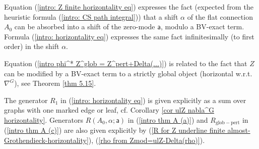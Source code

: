 \documentclass[11pt,a4paper]{amsart}
\theoremstyle{plain} %
\theoremstyle{definition}
\theoremstyle{remark}
\newcommand{\mr}{\mathrm}
\newcommand{\sfa}{\mathsf{a}}
\begin{document}
Equation (\ref{intro: Z finite horizontality eq}) expresses the fact (expected from the heuristic formula (\ref{intro: CS path integral})) that a shift $\alpha$ of the flat connection $A_0$ can be absorbed into a shift of the zero-mode $\sfa$, modulo a 
BV-exact term.
Formula (\ref{intro: horizontality eq}) expresses the same fact infinitesimally (to first order) in the shift $\alpha$. 


Equation (\ref{intro phi^* Z^glob = Z^pert+Delta(...)}) 
is related to
the fact that $Z$ can be modified by a BV-exact term to a strictly global object (horizontal w.r.t. $\nabla^G$), see Theorem \ref{thm 5.15}.


The generator $R_1$ in (\ref{intro: horizontality eq}) is given explicitly as a sum over graphs with one marked edge or leaf,  cf. Corollary \ref{cor ulZ nabla^G horizontality}. 
Generators $R(A_0,\alpha;\sfa)$ in (\ref{intro thm A (a)}) and $R_\mr{glob-pert}$ in (\ref{intro thm A (c)}) are also given explicitly by (\ref{R for Z underline finite almost-Grothendieck-horizontality}), (\ref{rho from Zmod=ulZ-Delta(rho)}).
\end{document}
